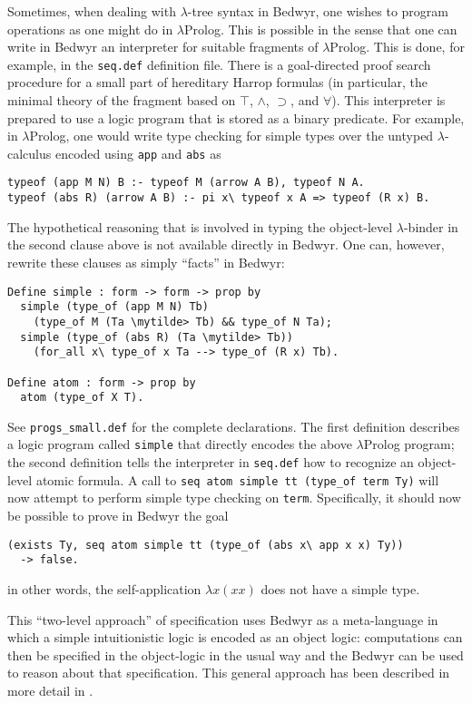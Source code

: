 \documentclass{article}
\newcommand{\mytilde}{\raise.3ex\hbox{$\scriptstyle\sim$}}
\newcommand{\lp}{$\lambda$Prolog}
\begin{document}
Sometimes, when dealing with $\lambda$-tree syntax in Bedwyr, one
wishes to program operations as one might do in \lp{}.  This is possible
in the sense that one can write in Bedwyr an interpreter for suitable
fragments of \lp{}.  This is done, for example, in the {\tt seq.def}
definition file.  There is a goal-directed proof search procedure for a
small part of hereditary Harrop formulas (in particular, the minimal
theory of the fragment based on $\top$, $\wedge$, $\supset$, and
$\forall$).  This interpreter is prepared to use a logic program that
is stored as a binary predicate.  For example, in \lp{}, one would write
type checking for simple types over the untyped $\lambda$-calculus
encoded using {\tt app} and {\tt abs} as
\begin{verbatim}
typeof (app M N) B :- typeof M (arrow A B), typeof N A.
typeof (abs R) (arrow A B) :- pi x\ typeof x A => typeof (R x) B.
\end{verbatim}
The hypothetical reasoning that is involved in typing the object-level
$\lambda$-binder in the second clause above is not available directly
in Bedwyr.  One can, however, rewrite these clauses as simply
``facts'' in Bedwyr:
\begin{Verbatim}
Define simple : form -> form -> prop by
  simple (type_of (app M N) Tb)
    (type_of M (Ta \mytilde> Tb) && type_of N Ta);
  simple (type_of (abs R) (Ta \mytilde> Tb))
    (for_all x\ type_of x Ta --> type_of (R x) Tb).

Define atom : form -> prop by
  atom (type_of X T).
\end{Verbatim}
See \verb+progs_small.def+ for the complete declarations. The first
definition describes a logic program called {\tt simple} that directly
encodes the above \lp{} program; the second definition tells the
interpreter in {\tt seq.def} how to recognize an object-level atomic
formula.  A call to \verb+seq atom simple tt (type_of term Ty)+ will now
attempt to perform simple type checking on {\tt term}.  Specifically, it
should now be possible to prove in Bedwyr the goal
\begin{verbatim}
(exists Ty, seq atom simple tt (type_of (abs x\ app x x) Ty))
  -> false.
\end{verbatim}
in other words, the self-application $\lambda x(x x)$ does not have a
simple type.

This ``two-level approach'' of specification uses Bedwyr as a
meta-language in which a simple intuitionistic logic is encoded as an
object logic: computations can then be specified in the object-logic
in the usual way and the Bedwyr can be used to reason about that specification.
This general approach has been described in more detail in
\cite{miller06ijcar}.
\end{document}
